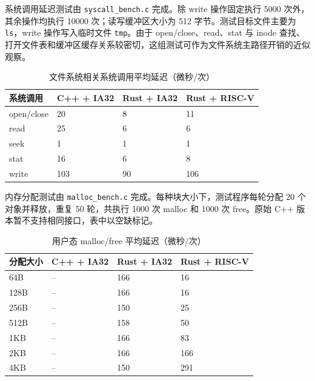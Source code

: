 系统调用延迟测试由 \texttt{syscall\_bench.c} 完成。除 write 操作固定执行 5000 次外，其余操作均执行 10000 次；读写缓冲区大小为 512 字节。测试目标文件主要为 \texttt{ls}，write 操作写入临时文件 \texttt{tmp}。由于 open/close、read、stat 与 inode 查找、打开文件表和缓冲区缓存关系较密切，这组测试可作为文件系统主路径开销的近似观察。

\begin{table}[htbp]
  \centering
  \caption{文件系统相关系统调用平均延迟（微秒/次）}\label{tab:syscall-bench}
  \begin{tabular}{p{}p{}p{}p{}}
    \toprule
    \textbf{系统调用} & \textbf{C++ + IA32} & \textbf{Rust + IA32} & \textbf{Rust + RISC-V} \\
    \midrule
    open/close & 20 & 8 & 11 \\
    read       & 25 & 6 & 6 \\
    seek       & 1  & 1 & 1 \\
    stat       & 16 & 6 & 8 \\
    write      & 103 & 90 & 106 \\
    \bottomrule
  \end{tabular}
\end{table}

内存分配测试由 \texttt{malloc\_bench.c} 完成。每种块大小下，测试程序每轮分配 20 个对象并释放，重复 50 轮，共执行 1000 次 malloc 和 1000 次 free。原始 C++ 版本暂不支持相同接口，表中以空缺标记。

\begin{table}[htbp]
  \centering
  \caption{用户态 malloc/free 平均延迟（微秒/次）}\label{tab:malloc-bench}
  \begin{tabular}{p{}p{}p{}p{}}
    \toprule
    \textbf{分配大小} & \textbf{C++ + IA32} & \textbf{Rust + IA32} & \textbf{Rust + RISC-V} \\
    \midrule
    64B   & -- & 166 & 16 \\
    128B  & -- & 166 & 16 \\
    256B  & -- & 150 & 25 \\
    512B  & -- & 158 & 50 \\
    1KB   & -- & 166 & 83 \\
    2KB   & -- & 166 & 166 \\
    4KB   & -- & 150 & 291 \\
    \bottomrule
  \end{tabular}
\end{table}

